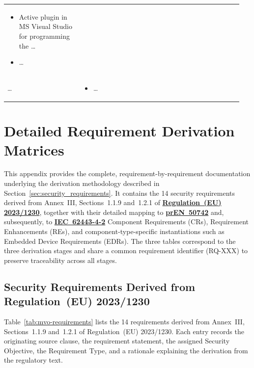 \begin{table}[hbt]
\begin{tabular}{>{\raggedright\arraybackslash}p{0.3\linewidth} >{\raggedright\arraybackslash}p{0.65\linewidth}}
		\begin{itemize}[noitemsep,topsep=0pt,partopsep=0pt,parsep=0pt] 
			\item Active plugin in MS Visual Studio for programming the \ldots
			\item \ldots
		\end{itemize} \\ 
		\ldots	&	\vspace{-\topsep}
		\begin{itemize}[noitemsep,topsep=0pt,partopsep=0pt,parsep=0pt] 
			\item \ldots
		\end{itemize} \\ 
		\hline 
	\end{tabular} 
\end{table}

\clearpage

\chapter{Detailed Requirement Derivation Matrices}
\label{app:requirement_derivation}

This appendix provides the complete, requirement-by-requirement documentation underlying the derivation methodology described in Section~\ref{sec:security_requirements}. It contains the 14 security requirements derived from Annex~III, Sections~1.1.9 and~1.2.1 of \hyperref[subsec:eu_machinery_regulation]{\textbf{Regulation~(EU) 2023/1230}}, together with their detailed mapping to \hyperref[subsec:pren_50742]{\textbf{prEN~50742}} and, subsequently, to \hyperref[subsec:iec_62443]{\textbf{IEC~62443-4-2}} Component Requirements (CRs), Requirement Enhancements (REs), and component-type-specific instantiations such as Embedded Device Requirements (EDRs). The three tables correspond to the three derivation stages and share a common requirement identifier (RQ-XXX) to preserve traceability across all stages.

\section{Security Requirements Derived from Regulation~(EU) 2023/1230}
\label{app:sec:mvo_requirements}

Table~\ref{tab:mvo-requirements} lists the 14 requirements derived from Annex~III, Sections~1.1.9 and~1.2.1 of Regulation~(EU) 2023/1230. Each entry records the originating source clause, the requirement statement, the assigned Security Objective, the Requirement Type, and a rationale explaining the derivation from the regulatory text.

